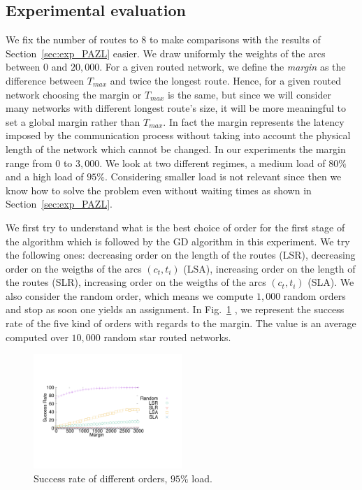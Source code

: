 \documentclass[10pt, conference, letterpaper]{IEEEtran}
\begin{document}
    \subsection{Experimental evaluation}
    \label{sec:resultsPALL}
    
    We fix the number of routes to $8$ to make comparisons with the results of Section~\ref{sec:exp_PAZL} easier. 
    We draw uniformly the weights of the arcs between $0$ and $20,000$.
    For a given routed network, we define the {\em margin} as the difference between $T_{max}$ and twice the longest route. 
    Hence, for a given routed network choosing the margin or $T_{max}$ is the same, but since we will consider many networks with different longest route's size, it will be more meaningful to set a global margin rather than $T_{max}$.
    In fact the margin represents the latency imposed by the communication process without taking into account the physical length of the network which cannot be changed. In our experiments the margin range from  $0$ to $3,000$.
   We look at two different regimes, a medium load of $80\%$ and a high load of $95\%$.
   Considering smaller load is not relevant since then we know how to solve the problem even without waiting times as shown in Section~\ref{sec:exp_PAZL}. 
   
   We first try to understand what is the best choice of order for the first stage of the algorithm which is followed by the GD algorithm in this experiment. We try the following ones: decreasing order on the length of the routes (LSR), decreasing order on the weigths of the arcs $(c_t,t_i)$ (LSA), increasing order on the length of the routes (SLR), increasing order on the weigths of the arcs $(c_t,t_i)$ (SLA). We also consider the random order, which means we compute $1,000$ random orders and stop as soon one yields an assignment.
   In Fig.~\ref{fig:success95} , we represent the success rate of the five kind of orders with regards to the margin. The value is an average computed over $10,000$ random star routed networks.

\begin{figure}[h] 
  \centering
    \includegraphics[width=0.5\textwidth]{departs_gp_21000.pdf}
      \caption{Success rate of different orders, $95\%$ load.}
      \label{fig:success95}
          \end{figure}
\end{document}
